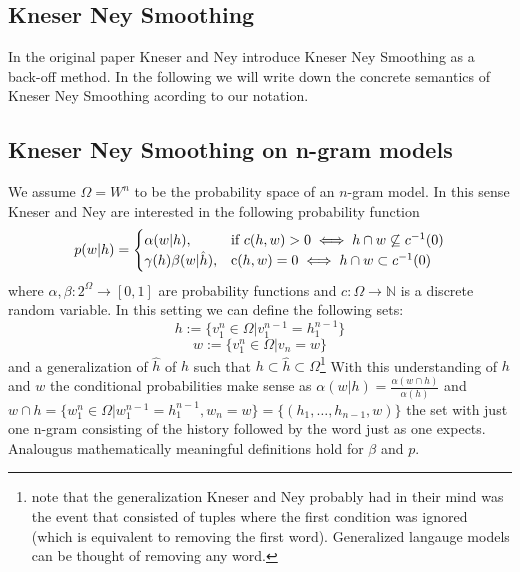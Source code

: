 \begin{appendix}
\chapter{Kneser Ney Smoothing}
In the original paper Kneser and Ney introduce Kneser Ney Smoothing as a back-off method. 
In the following we will write down the concrete semantics of Kneser Ney Smoothing acording to our notation. 
\section{Kneser Ney Smoothing on n-gram models}
We assume $\Omega=W^n$ to be the probability space of an $n$-gram model. 
In this sense Kneser and Ney are interested in the following probability function
\[
p(w|h)=
\begin{cases}
  \alpha(w|h),&\text{if } c(h,w)>0 \iff h\cap w\not\subseteq c^{-1}(0)\\
  \gamma(h)\beta(w|\hat h), &\text c(h,w)=0 \iff h\cap w\subset c^{-1}(0)
\end{cases}
\]
where $\alpha,\beta: 2^\Omega \rightarrow [0,1]$ are probability functions and $c:\Omega\rightarrow \mathbb{N}$ is a discrete random variable. 
In this setting we can define the following sets:
\[
h:=\{v_1^n\in\Omega|v_1^{n-1}=h_1^{n-1}\}
\]
\[
w:=\{v_1^n\in\Omega|v_n=w\}
\]
and a generalization of $\hat h$ of $h$ such that $h\subset\hat h\subset\Omega$\footnote{note that the generalization Kneser and Ney probably had in their mind was the event that consisted of tuples where the first condition was ignored (which is equivalent to removing the first word). Generalized langauge models can be thought of removing any word.}
With this understanding of $h$ and $w$ the conditional probabilities make sense as $\alpha(w|h)=\frac{\alpha(w \cap h)}{\alpha(h)}$ and $w\cap h=\{w_1^n\in \Omega | w_1^{n-1}=h_1^{n-1}, w_n=w\} = \{(h_1,\dots,h_{n-1},w)\}$ the set with just one n-gram consisting of the history followed by the word just as one expects.
Analougus mathematically meaningful definitions hold for $\beta$ and $p$.


\end{appendix}
